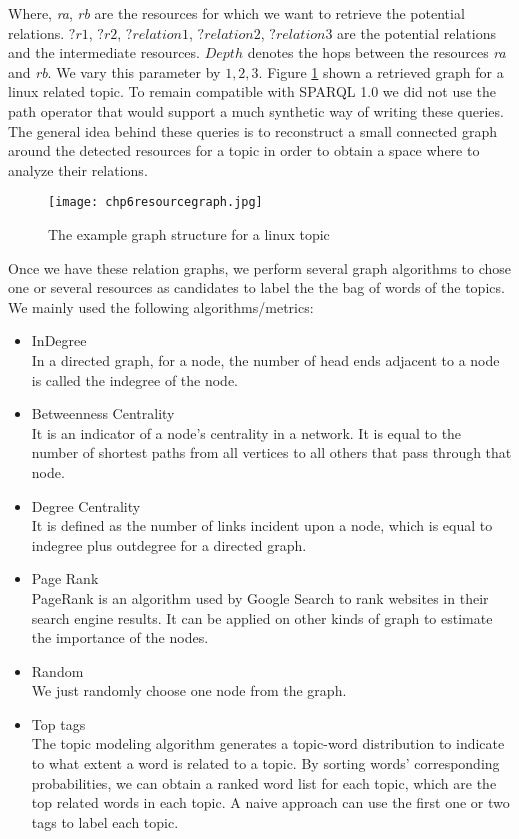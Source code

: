 Where, \textit{ra}, \textit{rb} are the resources for which we want to retrieve the potential relations. $?r1$, $?r2$, $?relation1$, $?relation2$, $?relation3$ are the potential relations and the intermediate resources. $Depth$ denotes the hops between the resources \textit{ra} and \textit{rb}. We vary this parameter by $1,2,3$. Figure \ref{fig:chp6resourcegraph} shown a retrieved graph for a linux related topic.
To remain compatible with SPARQL 1.0 we did not use the path operator that would support a much synthetic way of writing these queries. The general idea behind these queries is to reconstruct a small connected graph around the detected resources for a topic in order to obtain a space where to analyze their relations.

\begin{figure}[htp]
\centering
\texttt{[image: chp6resourcegraph.jpg]}  
\caption{The example graph structure for a linux topic}
\label{fig:chp6resourcegraph} 
\end{figure}

Once we have these relation graphs, we perform several graph algorithms to chose one or several resources as candidates to label the the bag of words of the topics. We mainly used the following algorithms/metrics:
\begin{itemize}
    \item {InDegree} \\
    In a directed graph, for a node, the number of head ends adjacent to a node is called the indegree of the node. 
    \item {Betweenness Centrality } \\
    It is an indicator of a node's centrality in a network. It is equal to the number of shortest paths from all vertices to all others that pass through that node.
    \item {Degree Centrality} \\
    It is defined as the number of links incident upon a node, which is equal to indegree plus outdegree for a directed graph.
    \item {Page Rank\cite{chp6page1999pagerank}}\\
    PageRank is an algorithm used by Google Search to rank websites in their search engine results. It can be applied on other kinds of graph to estimate the importance of the nodes.
    \item {Random} \\
    We just randomly choose one node from the graph.
    \item {Top tags} \\
    The topic modeling algorithm generates a topic-word distribution to indicate to what extent a word is related to a topic. By sorting words' corresponding probabilities, we can obtain a ranked word list for each topic, which are the top related words in each topic. A naive approach can use the first one or two tags to label each topic. 

\end{itemize}

